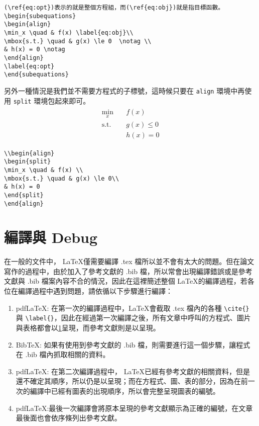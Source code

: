 \documentclass[12pt,a4paper]{report}
\begin{document}
\begin{CJK}{UTF8}{bkai}
\begin{framed}
\begin{verbatim}
(\ref{eq:opt})表示的就是整個方程組，而(\ref{eq:obj})就是指目標函數。
\begin{subequations}
\begin{align}
\min_x \quad & f(x) \label{eq:obj}\\
\mbox{s.t.} \quad & g(x) \le 0  \notag \\
& h(x) = 0 \notag
\end{align}
\label{eq:opt}
\end{subequations}
\end{verbatim}
\end{framed}
另外一種情況是我們並不需要方程式的子標號，這時候只要在 \verb|align| 環境中再使用 \verb|split| 環境包起來即可。
\begin{align}
\begin{split}
\min_x \quad & f(x) \\
\mbox{s.t.} \quad & g(x) \le 0\\
& h(x) = 0 
\end{split}
\end{align}

\begin{framed}
\begin{verbatim}
\\begin{align}
\begin{split}
\min_x \quad & f(x) \\
\mbox{s.t.} \quad & g(x) \le 0\\
& h(x) = 0 
\end{split}
\end{align}
\end{verbatim}
\end{framed}

\chapter{編譯與 Debug}

在一般的文件中， \LaTeX 僅需要編譯 .tex 檔所以並不會有太大的問題。但在論文寫作的過程中，由於加入了參考文獻的 .bib 檔，所以常會出現編譯錯誤或是參考文獻與 .bib 檔案內容不合的情況，因此在這裡簡述整個 \LaTeX 的編譯過程，若各位在編譯過程中遇到問題，請依循以下步驟進行編譯：
\begin{enumerate}
\item pdfLaTeX: 在第一次的編譯過程中，\LaTeX 會截取 .tex 檔內的各種 \verb|\cite{}| 與 \verb|\label{}|，因此在經過第一次編譯之後，所有文章中呼叫的方程式、圖片與表格都會以\ref{}呈現，而參考文獻則是以\cite{unknown}呈現。
\item BibTeX: 如果有使用到參考文獻的 .bib 檔，則需要進行這一個步驟，讓程式在 .bib 檔內抓取相關的資料。
\item pdfLaTeX: 在第二次編譯過程中， \LaTeX 已經有參考文獻的相關資料，但是還不確定其順序，所以仍是以\cite{unknown}呈現；而在方程式、圖、表的部分，因為在前一次的編譯中已經有圖表的出現順序，所以會完整呈現圖表的編號。
\item pdfLaTeX:最後一次編譯會將原本呈現\cite{unknown}的參考文獻顯示為正確的編號，在文章最後面也會依序條列出參考文獻。
\end{enumerate}


\end{CJK}
\end{document}
